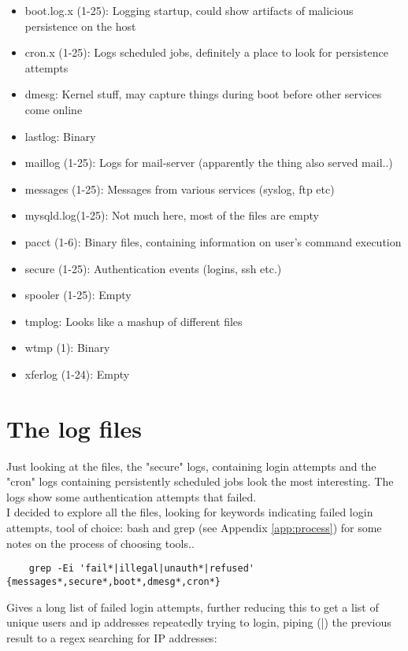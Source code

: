 \documentclass[
	letterpaper, %
	10pt, %
	unnumberedsections, %
	twoside, %
]{APAAssignment}
\begin{document}
\begin{itemize}
	\item boot.log.x (1-25): Logging startup, could show artifacts of malicious persistence on the host
	\item cron.x (1-25): Logs scheduled jobs, definitely a place to look for persistence attempts
	\item dmesg: Kernel stuff, may capture things during boot before other services come online
	\item lastlog: Binary
	\item maillog (1-25): Logs for mail-server (apparently the thing also served mail..)
	\item messages (1-25): Messages from various services (syslog, ftp etc)
	\item mysqld.log(1-25): Not much here, most of the files are empty
	\item pacct (1-6): Binary files, containing information on user's command execution
	\item secure (1-25): Authentication events (logins, ssh etc.)
	\item spooler (1-25): Empty
	\item tmplog: Looks like a mashup of different files
	\item wtmp (1): Binary
	\item xferlog (1-24): Empty
\end{itemize}

\section{The log files}
Just looking at the files, the "secure" logs, containing login attempts and the "cron" logs containing persistently scheduled jobs look the most interesting. The logs show some authentication attempts that failed.\\
I decided to explore all the files, looking for keywords indicating failed login attempts, tool of choice: bash and grep (see Appendix \ref{app:process}) for some notes on the process of choosing tools..

\begin{verbatim}
	grep -Ei 'fail*|illegal|unauth*|refused' {messages*,secure*,boot*,dmesg*,cron*}
\end{verbatim}

Gives a long list of failed login attempts, further reducing this to get a list of unique users and ip addresses repeatedly trying to login,
piping (|) the previous result to a regex searching for IP addresses:
\end{document}
